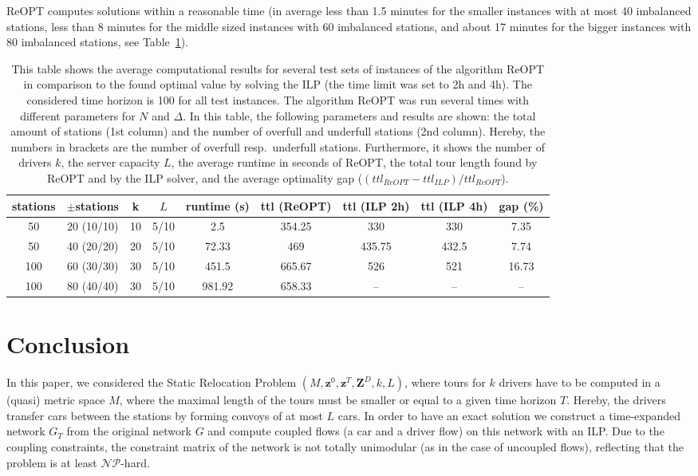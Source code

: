 \documentclass[english]{llncs}
\numberwithin{sublemma}{lemma}
\newcommand{\capd}{\ensuremath{L}}
\newcommand{\z}{\boldsymbol{z}}
\newcommand{\zd}{\boldsymbol{Z}^D} \newcommand{\zzd}{Z^D}
\newcommand{\NPhard}{\ensuremath{\mathcal{NP}}\hbox{-}hard}
\begin{document}
ReOPT computes solutions within a reasonable time (in average less than 1.5 minutes for the smaller instances with at most 40 imbalanced stations,
less than 8 minutes for the middle sized instances with 60 imbalanced stations,
and about 17 minutes for the bigger instances with 80 imbalanced stations, see Table~\ref{tab: computational results}).


\begin{table}
 \centering
 \caption{
    This table shows the average computational results for several test sets of instances of the algorithm ReOPT in comparison to the found optimal value by solving the ILP (the time limit was set to 2h and 4h).
    The considered time horizon is 100 for all test instances.
    The algorithm ReOPT was run several times with different parameters for $N$ and $\Delta$.
    In this table, the following parameters and results are shown: the total amount of stations (1st column) and the number of overfull and underfull stations (2nd column).
    Hereby, the numbers in brackets are the number of overfull resp.~underfull stations.
    Furthermore, it shows the number of drivers $k$, the server capacity \capd, the average runtime in seconds of ReOPT,
    the total tour length found by ReOPT and by the ILP solver, and the average optimality gap ($(ttl_{ReOPT} - ttl_{ILP}) / {ttl_{ReOPT}}$).
 }
 \label{tab: computational results}
\begin{tabular}{c|c|c|c|c|c|c|c|c}
 stations & $\pm$stations & k  & \capd  & runtime (s) & ttl (ReOPT) & ttl (ILP 2h) & ttl (ILP 4h) & gap (\%)  \\ \hline
 50       & 20 (10/10)    & 10 & 5/10 & 2.5        & 354.25      & 330      & 330      & 7.35      \\
 50       & 40 (20/20)    & 20 & 5/10 & 72.33      & 469         & 435.75   & 432.5    & 7.74      \\
 100      & 60 (30/30)    & 30 & 5/10 & 451.5      & 665.67      & 526      & 521      & 16.73     \\
 100      & 80 (40/40)    & 30 & 5/10 & 981.92     & 658.33      & --       & --       & --
\end{tabular}
\end{table}




\section{Conclusion}
\label{seq: conclusion}


In this paper, we considered the Static Relocation Problem $(M, \z^0, \z^T, \zd, k, \capd)$,
where tours for $k$ drivers have to be computed in a (quasi) metric space $M$, where the maximal length of the tours must be smaller or equal to a given time horizon $T$.
Hereby, the drivers transfer cars between the stations by forming convoys of at most $\capd$ cars.
In order to have an exact solution we construct a time-expanded network $G_T$ from the original network $G$ and compute coupled flows (a car and a driver flow) on this network with an ILP.
Due to the coupling constraints, the constraint matrix of the network is not totally unimodular (as in the case of uncoupled flows),
reflecting that the problem is at least \NPhard.
\end{document}
